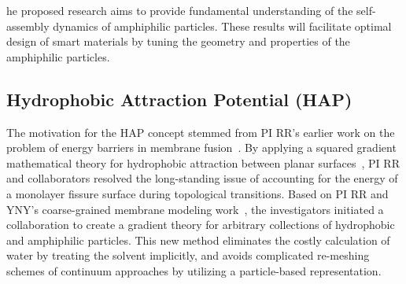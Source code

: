 %
%
he proposed research aims to provide fundamental understanding of the self-assembly dynamics of amphiphilic particles. These results will facilitate optimal design of smart materials by
tuning the geometry and properties of the amphiphilic particles.


\subsection{Hydrophobic Attraction Potential (HAP)}
\label{sec:HAP}
The motivation for the HAP concept stemmed from PI RR's earlier work on
the problem of energy barriers in membrane
fusion~\cite{RyKlYaCo16,Chetal16}. By applying a squared gradient
mathematical theory for hydrophobic attraction between planar
surfaces~\cite{Eriksson1989,Lum1999,Menshikov2017,Marcelja1977}, PI RR
and collaborators resolved the long-standing issue of accounting for the
energy of a monolayer fissure surface during topological transitions.
Based on PI RR and YNY's coarse-grained membrane modeling
work~\cite{Fu2017}, the investigators initiated a collaboration to
create a gradient theory for arbitrary collections of hydrophobic and
amphiphilic particles. This new method eliminates the costly calculation
of water by treating the solvent implicitly, and avoids complicated
re-meshing schemes of continuum approaches by utilizing a particle-based
representation.

